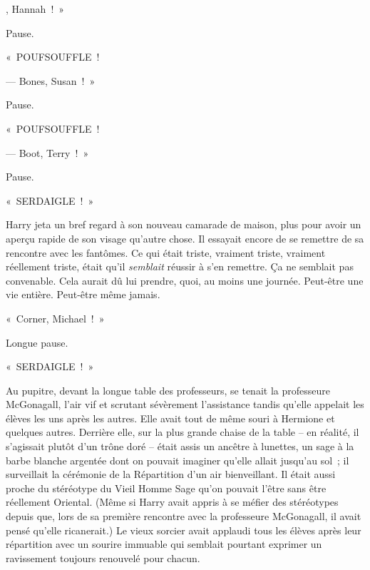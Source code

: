 

, Hannah~!~»

\hplettrineextrapara
Pause.

«~POUFSOUFFLE~!

--- Bones, Susan~!~»

Pause.

«~POUFSOUFFLE~!

--- Boot, Terry~!~»

Pause.

«~SERDAIGLE~!~»

Harry jeta un bref regard à son nouveau camarade de maison, plus pour avoir un aperçu rapide de son visage qu'autre chose.
Il essayait encore de se remettre de sa rencontre avec les fantômes.
Ce qui était triste, vraiment triste, vraiment réellement triste, était qu'il \emph{semblait} réussir à s'en remettre.
Ça ne semblait pas convenable.
Cela aurait dû lui prendre, quoi, au moins une journée.
Peut-être une vie entière.
Peut-être même jamais.

«~Corner, Michael~!~»

Longue pause.

«~SERDAIGLE~!~»

Au pupitre, devant la longue table des professeurs, se tenait la professeure McGonagall, l'air vif et scrutant sévèrement l'assistance tandis qu'elle appelait les élèves les uns après les autres.
Elle avait tout de même souri à Hermione et quelques autres.
Derrière elle, sur la plus grande chaise de la table -- en réalité, il s'agissait plutôt d'un trône doré -- était assis un ancêtre à lunettes, un sage à la barbe blanche argentée dont on pouvait imaginer qu'elle allait jusqu'au sol~; il surveillait la cérémonie de la Répartition d'un air bienveillant.
Il était aussi proche du stéréotype du Vieil Homme Sage qu'on pouvait l'être sans être réellement Oriental.
(Même si Harry avait appris à se méfier des stéréotypes depuis que, lors de sa première rencontre avec la professeure McGonagall, il avait pensé qu'elle ricanerait.)
Le vieux sorcier avait applaudi tous les élèves après leur répartition avec un sourire immuable qui semblait pourtant exprimer un ravissement toujours renouvelé pour chacun.

